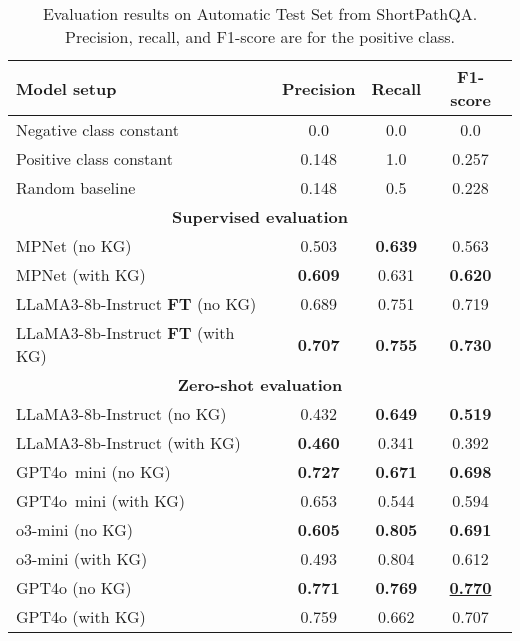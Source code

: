 \begin{table}[ht!]
    \caption{Evaluation results on Automatic Test Set from ShortPathQA. Precision, recall, and F1-score are for the positive class.}
    \label{tab:controllable_fusion:shortpathqa:res_baselines_auto}
    \centering
    \begin{tabular}{lccc}
        \toprule
        \textbf{Model setup} & \textbf{Precision} & \textbf{Recall} & \textbf{F1-score} \\
        \midrule
        Negative class constant & 0.0 & 0.0 & 0.0 \\
        Positive class constant & 0.148 & 1.0 & 0.257 \\
        Random baseline & 0.148 & 0.5 & 0.228 \\
        \midrule
        \multicolumn{4}{c}{\textbf{Supervised evaluation}} \\
        \midrule
        MPNet (no KG)  & 0.503 & \textbf{0.639} & 0.563 \\
        MPNet (with KG)  & \textbf{0.609} & 0.631 & \textbf{0.620} \\
        \hline
        LLaMA3-8b-Instruct \textbf{FT} (no KG)  & 0.689 & 0.751 & 0.719 \\
        LLaMA3-8b-Instruct \textbf{FT} (with KG) & \textbf{0.707} & \textbf{0.755} & \textbf{0.730} \\
        \midrule
        \multicolumn{4}{c}{\textbf{Zero-shot evaluation}} \\
        \midrule
        LLaMA3-8b-Instruct (no KG)  & 0.432 & \textbf{0.649} & \textbf{0.519} \\
        LLaMA3-8b-Instruct (with KG)  & \textbf{0.460} & 0.341 & 0.392 \\
        \hline
        GPT4o~mini (no KG)  & \textbf{0.727} & \textbf{0.671} & \textbf{0.698} \\
        GPT4o~mini (with KG) & 0.653 & 0.544 & 0.594 \\
        \hline
        o3-mini (no KG)  & \textbf{0.605} & \textbf{0.805} & \textbf{0.691} \\
        o3-mini (with KG)  & 0.493 & 0.804 & 0.612 \\
        \hline
        GPT4o (no KG)  & \textbf{0.771} & \textbf{0.769} & \textbf{\underline{0.770}} \\
        GPT4o (with KG)  & 0.759 & 0.662 & 0.707 \\
        \bottomrule
    \end{tabular}
\end{table}


